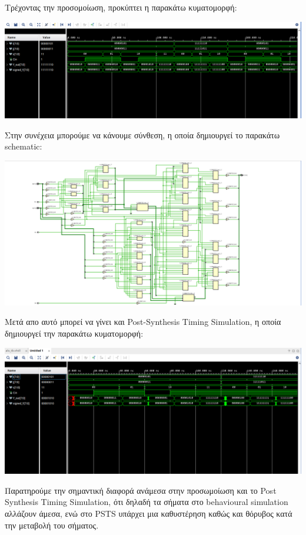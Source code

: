 \documentclass[11pt, a4paper]{report}
\begin{document}
Τρέχοντας την προσομοίωση, προκύπτει η παρακάτω κυματομορφή:
\begin{center}
	\includegraphics[width=\textwidth]{./images/alu-1/Behavioral_Sim_Fixed.png}
\end{center}

Στην συνέχεια μπορούμε να κάνουμε σύνθεση, η οποία δημιουργεί το παρακάτω schematic:
\begin{center}
	\includegraphics[width=\textwidth]{./images/alu-1/Synth_Schematic.png}
\end{center}

Μετά απο αυτό μπορεί να γίνει και Post-Synthesis Timing Simulation, η οποία δημιουργεί την παρακάτω κυματομορφή:
\begin{center}
	\includegraphics[width=\textwidth]{./images/alu-1/PST_Fixed.png}
\end{center}

Παρατηρούμε την σημαντική διαφορά ανάμεσα στην προσωμοίωση και το Post Synthesis Timing Simulation, ότι δηλαδή τα σήματα στο behavioural simulation αλλάζουν άμεσα, ενώ στο PSTS υπάρχει μια καθυστέρηση καθώς και θόρυβος κατά την μεταβολή του σήματος.
\end{document}

